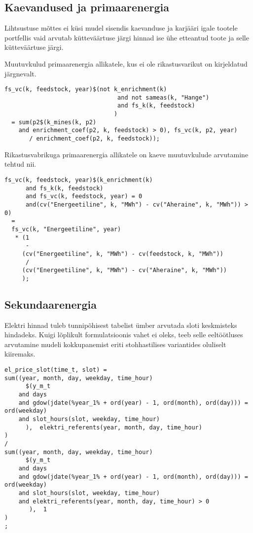 \subsection{Kaevandused ja primaarenergia}
Lihtsustuse mõttes ei küsi mudel sisendis kaevanduse ja karjääri igale tootele portfellis vaid arvutab kütteväärtuse järgi hinnad ise ühe etteantud toote ja selle kütteväärtuse järgi.

Muutuvkulud primaarenergia allikatele, kus ei ole rikastusvarikut on kirjeldatud järgnevalt.
\begin{verbatim}
fs_vc(k, feedstock, year)$(not k_enrichment(k)
                                and not sameas(k, "Hange")
                                and fs_k(k, feedstock)
                               )
  = sum(p2$(k_mines(k, p2)
    and enrichment_coef(p2, k, feedstock) > 0), fs_vc(k, p2, year) 
       / enrichment_coef(p2, k, feedstock));
\end{verbatim}

Rikastusvabrikuga primaarenergia allikatele on kaeve muutuvkulude arvutamine tehtud nii.
\begin{verbatim}
fs_vc(k, feedstock, year)$(k_enrichment(k)
      and fs_k(k, feedstock)
      and fs_vc(k, feedstock, year) = 0
      and(cv("Energeetiline", k, "MWh") - cv("Aheraine", k, "MWh")) > 0)
  =
  fs_vc(k, "Energeetiline", year)
   * (1
      -
     (cv("Energeetiline", k, "MWh") - cv(feedstock, k, "MWh"))
      /
     (cv("Energeetiline", k, "MWh") - cv("Aheraine", k, "MWh"))
     );
\end{verbatim}

\subsection{Sekundaarenergia}
Elektri hinnad tuleb tunnipõhisest tabelist ümber arvutada sloti keskmisteks hindadeks. Kuigi lõplikult formulatsioonis vahet ei oleks, teeb selle eeltöötluses arvutamine mudeli kokkupanemist eriti stohhastilises variantides oluliselt kiiremaks.
\begin{verbatim}
el_price_slot(time_t, slot) =
sum((year, month, day, weekday, time_hour)
      $(y_m_t
    and days
    and gdow(jdate(%year_1% + ord(year) - 1, ord(month), ord(day))) = ord(weekday)
    and slot_hours(slot, weekday, time_hour)
      ),  elektri_referents(year, month, day, time_hour)
)
/
sum((year, month, day, weekday, time_hour)
      $(y_m_t
    and days
    and gdow(jdate(%year_1% + ord(year) - 1, ord(month), ord(day))) = ord(weekday)
    and slot_hours(slot, weekday, time_hour)
    and elektri_referents(year, month, day, time_hour) > 0
       ),  1
)
;
\end{verbatim}

